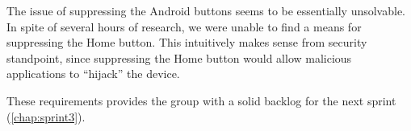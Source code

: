 The issue of suppressing the Android buttons seems to be essentially unsolvable. In spite of several hours of research, we were unable to find a means for suppressing the Home button. This intuitively makes sense from security standpoint, since suppressing the Home button would allow malicious applications to ``hijack'' the device.

These requirements provides the group with a solid backlog for the next sprint (\cref{chap:sprint3}).